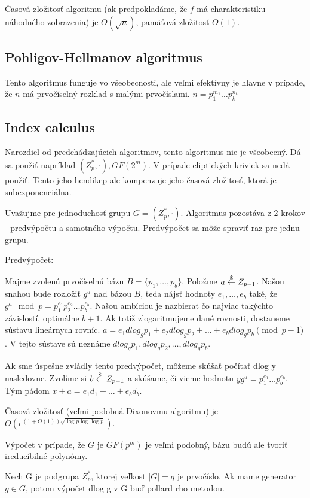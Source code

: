 Časová zložitosť algoritmu (ak predpokladáme,
že $f$ má charakteristiku náhodného zobrazenia) je
$O(\sqrt{n})$, pamäťová zložitosť $O(1)$.

\subsection{Pohligov-Hellmanov algoritmus}
Tento algoritmus funguje vo všeobecnosti, ale veľmi efektívny je hlavne v
prípade, že $n$ má prvočíselný rozklad s malými prvočíslami.
$n=p_1^{m_1} \dots p_k^{n_k}$



\subsection{Index calculus}
Narozdiel od predchádzajúcich algoritmov, tento algoritmus nie je
všeobecný. Dá sa použiť napríklad $(Z_p^*,\cdot), GF(2^m)$.
V prípade eliptických kriviek sa nedá použiť. Tento jeho hendikep
ale kompenzuje jeho časová zložitosť, ktorá je subexponenciálna.

Uvažujme pre jednoduchosť grupu $G=(Z_p^*,\cdot)$.
Algoritmus pozostáva z 2 krokov - predvýpočtu a samotného výpočtu.
Predvýpočet sa môže spraviť raz pre jednu grupu.

Predvýpočet:

Majme zvolenú prvočíselnú bázu $B=\{p_1,\dots,p_b\}$.
Položme $a \overset{\$}{\leftarrow} Z_{p-1}$. 
Našou snahou bude rozložiť $g^a$ nad bázou $B$, teda nájsť hodnoty
$e_1,\dots,e_b$ také, že $g^a \mod p = p_1^{e_1} p_2^{e_2} \dots
p_b^{e_b}$.
Našou ambíciou je nazbierať čo najviac takýchto závislostí, optimálne
$b+1$. Ak totiž zlogaritmujeme dané rovnosti, dostaneme sústavu
lineárnych rovníc.
$a=e_1 dlog_g p_1 + e_2 dlog_g p_2 + \dots + e_b dlog_g p_b \pmod{p-1}$.
V tejto sústave sú neznáme $dlog_g p_1, dlog_g p_2, \dots, dlog_g p_b$.

Ak sme úspešne zvládly tento predvýpočet, môžeme skúšať počítať dlog y
nasledovne.
Zvolíme si $b\overset{\$}{\leftarrow} Z_{p-1}$ a skúšame, či vieme hodnotu
$y g^a = p_1 ^ {e_1} \dots p_b ^ {e_b}$. Tým pádom
$x+a = e_1 d_1 + \dots + e_b d_b$.

Časová zložitosť (veľmi podobná Dixonovmu algoritmu) je
$O(e^{(1+O(1))\sqrt{\log p \log \log p}})$.

\begin{poznamka}
    Výpočet v prípade, že $G$ je $GF(p^m)$ je veľmi podobný, bázu budú ale
    tvoriť ireducibilné polynómy.
\end{poznamka}
\begin{poznamka}
    Nech G je podgrupa $Z_p^*$, ktorej veľkost $|G|=q$ je prvočíslo.
    Ak mame generator $g\in G$, potom výpočet dlog g v G buď pollard rho
    metodou.
\end{poznamka}
